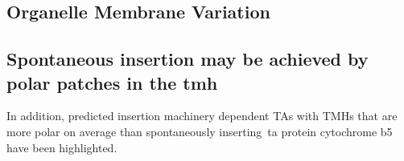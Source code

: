 \subsection{Organelle Membrane Variation}











\subsection{Spontaneous insertion may be achieved by polar patches in the \gls{tmh}}

In addition, predicted insertion machinery dependent TAs with TMHs that are more polar on average than spontaneously inserting~\gls{ta} protein cytochrome b5 have been highlighted.






